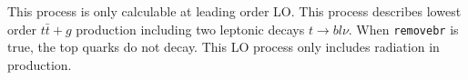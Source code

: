 
This process is only calculable at leading order LO.
This process describes lowest order $t \bar{t}+g$ production
including two leptonic decays $t \to b l \nu$.
When {\tt removebr} is true, the top quarks do not decay.
This LO process only includes radiation in production.
